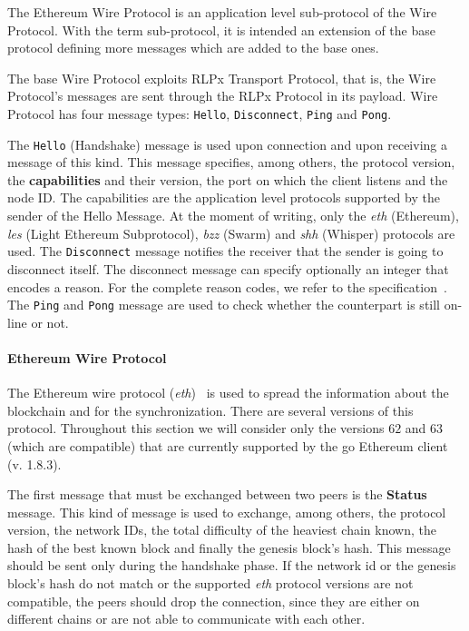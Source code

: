 The Ethereum Wire Protocol is an application level sub-protocol of the \devpp{}
Wire Protocol. With the term sub-protocol, it is intended an extension of the
base protocol defining more messages which are added to the base ones.

The base \devpp{} Wire Protocol exploits RLPx Transport Protocol, that is, the
\devpp{} Wire Protocol's messages are sent through the RLPx Protocol in its
payload. \devpp{} Wire Protocol has four message types: \verb+Hello+,
\verb+Disconnect+, \verb+Ping+ and \verb+Pong+.

The \verb+Hello+ (Handshake) message is used upon connection and upon receiving
a message of this kind. This message specifies, among others, the protocol
version, the \textbf{capabilities} and their version, the port on which the
client listens and the node ID. The capabilities are the application level
protocols supported by the sender of the Hello Message. At the moment of
writing, only the \emph{eth} (Ethereum), \emph{les} (Light Ethereum
Subprotocol), \emph{bzz} (Swarm) and \emph{shh} (Whisper) protocols are used.
The \verb+Disconnect+ message notifies the receiver that the sender is going to
disconnect itself. The disconnect message can specify optionally an integer that
encodes a reason. For the complete reason codes, we refer to the \devpp{}
specification~\cite{devp2pwire}. The \verb+Ping+ and \verb+Pong+ message are
used to check whether the counterpart is still on-line or not.


\paragraph{Ethereum Wire Protocol}
The Ethereum wire protocol (\emph{eth})~\cite{bib:ethereumwireprotocol} is used
to spread the information about the blockchain and for the synchronization.
There are several versions of this protocol. Throughout this section we will
consider only the versions $62$ and $63$ (which are compatible) that are
currently supported by the go Ethereum client (v. 1.8.3).

The first message that must be exchanged between two peers
is the \textbf{Status} message. This kind of message is used to exchange,
among others, the protocol version, the network IDs, the total difficulty of the
heaviest chain known, the hash of the best known block and
finally the genesis block's hash. This message should be sent only during
the handshake phase.
If the network id or the genesis block's hash do not match or the supported
\emph{eth} protocol versions are not compatible, the peers should drop
the connection, since they are either on different chains or are not able to
communicate with each other.




